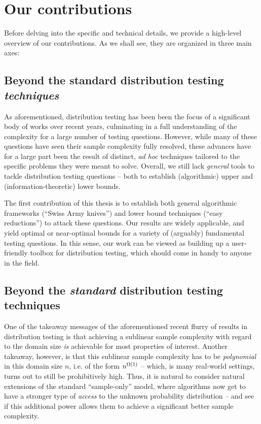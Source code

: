 \section*{Our contributions}
Before delving into the specific and technical details, we provide a high-level overview of our contributions. As we shall see, they are organized in three main axes:

\subsection*{Beyond the standard distribution testing \emph{techniques}}  As aforementioned, distribution testing has been been the focus of a significant body of works over recent years, culminating in a full understanding of the complexity for a large number of testing questions. However, while many of these questions have seen their sample complexity fully resolved, these advances have for a large part been the result of distinct, \textit{ad hoc} techniques tailored to the specific problems they were meant to solve. Overall, we still lack \emph{general} tools to tackle distribution testing questions -- both to establish (algorithmic) upper and (information-theoretic) lower bounds.

The first contribution of this thesis is to establish both general algorithmic frameworks (``Swiss Army knives'') and lower bound techniques (``easy reductions'') to attack these questions. Our results are widely applicable, and yield optimal or near-optimal bounds for a variety of (arguably) fundamental testing questions. In this sense, our work can be viewed as building up a user-friendly toolbox for distribution testing, which should come in handy to anyone in the field.

\subsection*{Beyond the \emph{standard} distribution testing techniques} One of the takeaway messages of the aforementioned recent flurry of results in distribution testing is that achieving a sublinear sample complexity with regard to the domain size \emph{is} achievable for most properties of interest. Another takeaway, however, is that this sublinear sample complexity has to be \emph{polynomial} in this domain size $n$, i.e. of the form $n^{\bigOmega{1}}$ -- which, is many real-world settings, turns out to still be prohibitively high. Thus, it is natural to consider natural extensions of the standard ``sample-only'' model, where algorithms now get to have a stronger type of \emph{access} to the unknown probability distribution -- and see if this additional power allows them to achieve a significant better sample complexity. 

